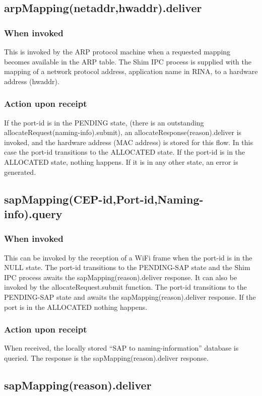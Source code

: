 \subsection{arpMapping(netaddr,hwaddr).deliver}
\subsubsection{When invoked}
This is invoked by the ARP protocol machine when a requested mapping becomes available in the ARP table. The Shim IPC process is supplied with the mapping of a network protocol address, application name in RINA, to a hardware address (hwaddr).
\subsubsection{Action upon receipt}
If the port-id is in the PENDING state, (there is an outstanding allocateRequest(naming-info).submit), an allocateResponse(reason).deliver is invoked, and the hardware address (MAC address) is stored for this flow.  In this case the port-id transitions to the ALLOCATED state. If the port-id is in the ALLOCATED state, nothing happens. If it is in any other state, an error is generated.

\subsection{sapMapping(CEP-id,Port-id,Naming-info).query}
\subsubsection{When invoked}
This can be invoked by the reception of a WiFi frame when the port-id is in the NULL state. The port-id transitions to the PENDING-SAP state and the Shim IPC process awaits the sapMapping(reason).deliver response. It can also be invoked by the allocateRequest.submit function. The port-id transitions to the PENDING-SAP state and awaits the sapMapping(reason).deliver response. If the port is in the ALLOCATED nothing happens.
\subsubsection{Action upon receipt}
When received, the locally stored ``SAP to naming-information'' database is queried. The response is the sapMapping(reason).deliver response.

\subsection{sapMapping(reason).deliver}
